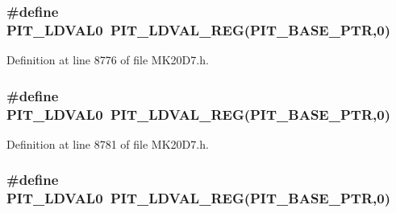 \subsubsection[{\texorpdfstring{P\+I\+T\+\_\+\+L\+D\+V\+A\+L0}{PIT_LDVAL0}}]{\setlength{\rightskip}{0pt plus 5cm}\#define P\+I\+T\+\_\+\+L\+D\+V\+A\+L0~{\bf P\+I\+T\+\_\+\+L\+D\+V\+A\+L\+\_\+\+R\+EG}({\bf P\+I\+T\+\_\+\+B\+A\+S\+E\+\_\+\+P\+TR},0)}\hypertarget{group___p_i_t___register___accessor___macros_ga7ec0541e320eaa3953407fd3f8ff3a89}{}\label{group___p_i_t___register___accessor___macros_ga7ec0541e320eaa3953407fd3f8ff3a89}


Definition at line 8776 of file M\+K20\+D7.\+h.

\subsubsection[{\texorpdfstring{P\+I\+T\+\_\+\+L\+D\+V\+A\+L0}{PIT_LDVAL0}}]{\setlength{\rightskip}{0pt plus 5cm}\#define P\+I\+T\+\_\+\+L\+D\+V\+A\+L0~{\bf P\+I\+T\+\_\+\+L\+D\+V\+A\+L\+\_\+\+R\+EG}({\bf P\+I\+T\+\_\+\+B\+A\+S\+E\+\_\+\+P\+TR},0)}\hypertarget{group___p_i_t___register___accessor___macros_ga7ec0541e320eaa3953407fd3f8ff3a89}{}\label{group___p_i_t___register___accessor___macros_ga7ec0541e320eaa3953407fd3f8ff3a89}


Definition at line 8781 of file M\+K20\+D7.\+h.

\subsubsection[{\texorpdfstring{P\+I\+T\+\_\+\+L\+D\+V\+A\+L0}{PIT_LDVAL0}}]{\setlength{\rightskip}{0pt plus 5cm}\#define P\+I\+T\+\_\+\+L\+D\+V\+A\+L0~{\bf P\+I\+T\+\_\+\+L\+D\+V\+A\+L\+\_\+\+R\+EG}({\bf P\+I\+T\+\_\+\+B\+A\+S\+E\+\_\+\+P\+TR},0)}\hypertarget{group___p_i_t___register___accessor___macros_ga7ec0541e320eaa3953407fd3f8ff3a89}{}\label{group___p_i_t___register___accessor___macros_ga7ec0541e320eaa3953407fd3f8ff3a89}


